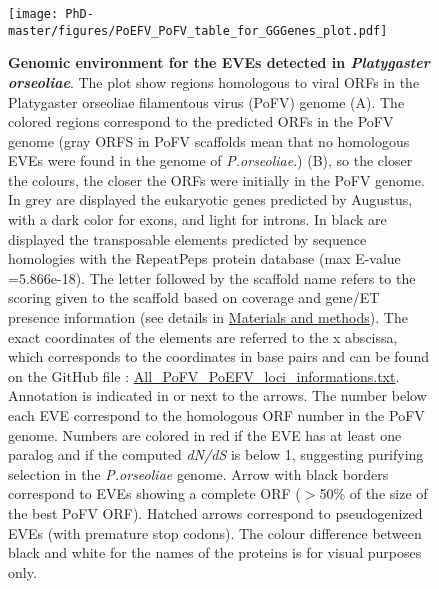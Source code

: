 \begin{figure}[!htpbt]
\texttt{[image: PhD-master/figures/PoEFV\_PoFV\_table\_for\_GGGenes\_plot.pdf]}\centering
\caption[Paper1:Filamentous EVE distribution along \textit{P.orseoliae} scaffolds]{\scriptsize \textbf{Genomic environment for the EVEs detected in \textit{Platygaster orseoliae}}. The plot show regions homologous to viral ORFs in the Platygaster orseoliae filamentous virus (PoFV) genome (A). The colored regions correspond to the predicted ORFs in the PoFV genome (gray ORFS in PoFV scaffolds mean that no homologous EVEs were found in the genome of \textit{P.orseoliae}.) (B), so the closer the colours, the closer the ORFs were initially in the PoFV genome. In grey are displayed the eukaryotic genes predicted by Augustus, with a dark color for exons, and light for introns. In black are displayed the transposable elements predicted by sequence homologies with the RepeatPeps protein database (max E-value =5.866e-18). The letter followed by the scaffold name refers to the scoring given to the scaffold based on coverage and gene/ET presence information (see details in \hyperref[sec:MM-5]{Materials and methods}). The exact coordinates of the elements are referred to the x abscissa, which corresponds to the coordinates in base pairs and can be found on the GitHub file : \href{https://github.com/BenjaminGuinet/PhD_defense/blob/main/Supplementary_paper1/All_PoFV_PoEFV_loci_informations.txt}{All\_PoFV\_PoEFV\_loci\_informations.txt}. Annotation is indicated in or next to the arrows. The number below each EVE correspond to the homologous ORF number in the PoFV genome. Numbers are colored in red if the EVE has at least one paralog and if the computed \textit{dN/dS} is below 1, suggesting purifying selection in the \textit{P.orseoliae} genome. Arrow with black borders correspond to EVEs showing a complete ORF ($>$50\% of the size of the best PoFV ORF). Hatched arrows correspond to pseudogenized EVEs (with premature stop codons).   The colour difference between black and white for the names of the proteins is for visual purposes only.}
\label{figure:Porseoliae_endogenization_events_gene_plot}
\end{figure}


